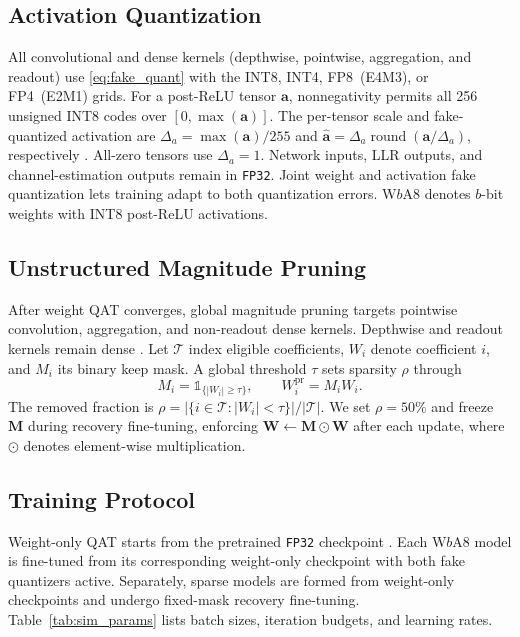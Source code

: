 \vspace{-2mm}

\subsection{Activation Quantization}
\label{sec:act_quant}
All convolutional and dense kernels (depthwise, pointwise,
aggregation, and readout) use \eqref{eq:fake_quant} with the INT8,
INT4, FP8~(E4M3), or FP4~(E2M1) grids. For a
post-\gls{ReLU} tensor $\mathbf{a}$, nonnegativity permits all 256
unsigned INT8 codes over $[0,\max(\mathbf{a})]$. The per-tensor scale
and fake-quantized activation are
$\Delta_a=\max(\mathbf{a})/255$ and
$\widehat{\mathbf{a}}=\Delta_a\operatorname{round}(\mathbf{a}/\Delta_a)$,
respectively \cite{jacob2018quantization}. All-zero tensors use
$\Delta_a=1$. Network inputs, LLR outputs, and channel-estimation
outputs remain in \texttt{FP32}. Joint weight and activation fake quantization lets
training adapt to both quantization errors. W$b$A8 denotes $b$-bit
weights with INT8 post-\gls{ReLU} activations.

\vspace{-2mm}

\subsection{Unstructured Magnitude Pruning}
\label{sec:pruning}
After weight \gls{QAT} converges, global magnitude pruning targets
pointwise convolution, aggregation, and non-readout dense kernels.
Depthwise and readout kernels remain dense
\cite{song_han_1,kuzmin2023pruning}. Let $\mathcal{T}$ index eligible
coefficients, $W_i$ denote coefficient $i$, and $M_i$ its binary keep
mask. A global threshold $\tau$ sets sparsity $\rho$ through
\begin{equation}
\label{eq:prune_mask}
  M_i=\mathds{1}_{\{|W_i|\ge\tau\}},\qquad
  W_i^{\mathrm{pr}}=M_iW_i .
\end{equation}
The removed fraction is
$\rho=|\{i\in\mathcal{T}:|W_i|<\tau\}|/|\mathcal{T}|$. We set
$\rho=50\%$ and freeze $\mathbf{M}$ during recovery fine-tuning,
enforcing $\mathbf{W}\leftarrow\mathbf{M}\odot\mathbf{W}$ after each
update, where $\odot$ denotes element-wise multiplication.

\vspace{-2mm}

\subsection{Training Protocol}
Weight-only \gls{QAT} starts from the pretrained \texttt{FP32}
checkpoint \cite{neural_rx}. Each W$b$A8 model is fine-tuned from its
corresponding weight-only checkpoint with both fake quantizers active.
Separately, sparse models are formed from weight-only checkpoints and
undergo fixed-mask recovery fine-tuning. Table~\ref{tab:sim_params}
lists batch sizes, iteration budgets, and learning rates.
